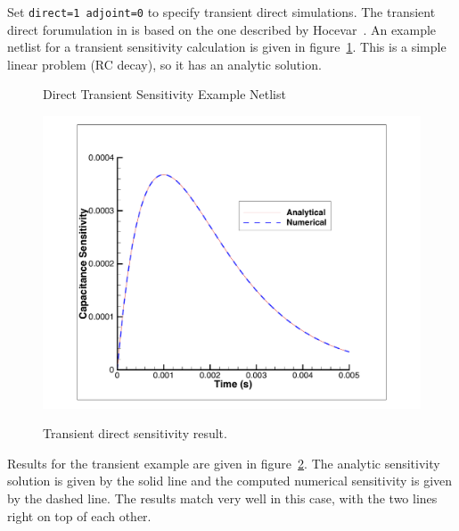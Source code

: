 Set \texttt{direct=1 adjoint=0} to specify transient direct simulations.  The 
transient direct forumulation in \Xyce{} is based on the one described by  
Hocevar~\cite{Hocevar1985}.  An example netlist for a transient sensitivity
calculation is given in figure~\ref{Tran_Sensitivity_Netlist}.  This is a simple 
linear problem (RC decay), so it has an analytic solution.  
\begin{figure}[htbp]
  \begin{centering}
\caption[Direct Transient Sensitivity Example Netlist]
{Direct Transient Sensitivity Example Netlist \label{Tran_Sensitivity_Netlist} }
\end{centering}
\end{figure}
\begin{figure}[ht]
  \centering
  \scalebox{0.5}
  {\includegraphics[]{sens}}
  \caption[Transient direct sensitivity result]
  {Transient direct sensitivity result.
\label{transientSensitivityResult}}
\end{figure}
Results for the transient example are given in figure~\ref{transientSensitivityResult}.
The analytic sensitivity solution is given by the solid line and the computed numerical
sensitivity is given by the dashed line.  The results match very well in this case,
with the two lines right on top of each other.

